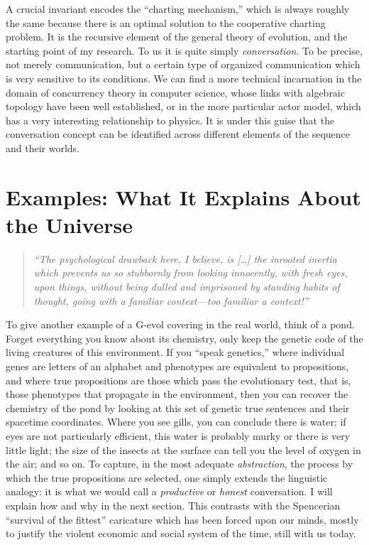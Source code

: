\documentclass[11pt]{article}
\newcommand{\quoteattr}[2]{%
  \par\smallskip{\normalfont\hfill--- #1\par\hfill\emph{#2}}%
}
\newenvironment{epigraphquote}
  {\begin{quote}\small\itshape}
  {\end{quote}}
\begin{document}
A crucial invariant encodes the ``charting mechanism,'' which is always roughly
the same because there is an optimal solution to the cooperative charting
problem. It is the recursive element of the general theory of evolution, and
the starting point of my research. To us it is quite simply \emph{conversation}.
To be precise, not merely communication, but a certain type of organized
communication which is very sensitive to its conditions. We can find a more
technical incarnation in the domain of concurrency theory in computer science,
whose links with algebraic topology have been well established, or in the more
particular actor model, which has a very interesting relationship to physics.
It is under this guise that the conversation concept can be identified across
different elements of the sequence and their worlds.

\section*{Examples: What It Explains About the Universe}

\begin{epigraphquote}
``The psychological drawback here, I believe, is [\ldots] the inrooted inertia
which prevents us so stubbornly from looking innocently, with fresh eyes, upon
things, without being dulled and imprisoned by standing habits of thought,
going with a familiar context---too familiar a context!''
\quoteattr{Alexander Grothendieck}{Pursuing Stacks}
\end{epigraphquote}

To give another example of a G-evol covering in the real world, think of a
pond. Forget everything you know about its chemistry, only keep the genetic
code of the living creatures of this environment. If you ``speak genetics,''
where individual genes are letters of an alphabet and phenotypes are equivalent
to propositions, and where true propositions are those which pass the
evolutionary test, that is, those phenotypes that propagate in the environment,
then you can recover the chemistry of the pond by looking at this set of
genetic true sentences and their spacetime coordinates. Where you see gills,
you can conclude there is water; if eyes are not particularly efficient, this
water is probably murky or there is very little light; the size of the insects
at the surface can tell you the level of oxygen in the air; and so on. To
capture, in the most adequate \emph{abstraction}, the process by which the true
propositions are selected, one simply extends the linguistic analogy: it is
what we would call a \emph{productive} or \emph{honest} conversation. I will
explain how and why in the next section. This contrasts with the Spencerian
``survival of the fittest'' caricature which has been forced upon our minds,
mostly to justify the violent economic and social system of the time, still
with us today.
\end{document}
